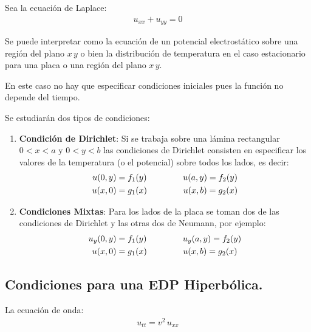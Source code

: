 Sea la ecuación de Laplace:
\begin{align*}
u_{xx} + u_{yy} = 0
\end{align*}

Se puede interpretar como la ecuación de un potencial electrostático sobre una región del plano $x \, y$ o bien la distribución de temperatura en el caso estacionario para una placa o una región del plano $x \, y$.

En este caso no hay que especificar condiciones iniciales pues la función no depende del tiempo.

Se estudiarán dos tipos de condiciones:

\begin{enumerate}
\item \textbf{Condición de Dirichlet}:
Si se trabaja sobre una lámina rectangular $0 < x < a$ y $0 < y < b$ las condiciones de Dirichlet consisten en especificar los valores de la temperatura (o el potencial) sobre todos los lados, es decir:
\begin{align}
\begin{aligned}
u(0, y) &= f_{1}(y) \hspace{1.5cm} u(a, y) = f_{2}(y) \\
u(x, 0) &= g_{1}(x) \hspace{1.5cm} u(x, b) = g_{2}(x)
\end{aligned}
\label{eq:ecuacion_06_02_05}
\end{align}
\item \textbf{Condiciones Mixtas}:
Para los lados de la placa se toman dos de las condiciones de Dirichlet y las otras dos de Neumann, por ejemplo:
\begin{align}
\begin{aligned}
u_{y}(0, y) &= f_{1}(y) \hspace{1.5cm} u_{y}(a, y) = f_{2}(y) \\
u(x, 0) &= g_{1}(x) \hspace{1.5cm} u(x, b) = g_{2}(x)
\end{aligned}
\label{eq:ecuacion_06_01_06}
\end{align}
\end{enumerate}

\subsection{Condiciones para una EDP Hiperbólica.}

La ecuación de onda:
\begin{align*}
u_{tt} = v^{2} \, u_{xx}
\end{align*}

